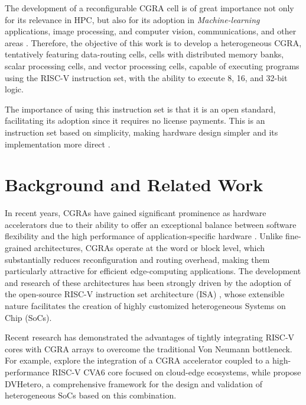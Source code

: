 \documentclass[conference]{IEEEtran}
\begin{document}
The development of a reconfigurable CGRA cell is of great importance not only for its relevance in HPC, but also for its adoption in \textit{Machine-learning} applications, image processing, and computer vision,
communications, and other areas \cite{GuoweiZhu}. Therefore, the objective of this work is to develop a heterogeneous CGRA, tentatively featuring data-routing cells,
cells with distributed memory banks, scalar processing cells, and vector processing cells, capable of executing programs using the RISC-V instruction set, with the ability to execute 8, 16, and 32-bit logic.

The importance of using this instruction set is that it is an open standard, facilitating its adoption since it requires no license payments. This is an instruction set based on simplicity,
making hardware design simpler and its implementation more direct \cite{riscv}.


\section{Background and Related Work}
In recent years, CGRAs have gained significant prominence as hardware accelerators due to their ability to offer an exceptional balance between software flexibility and the high performance of application-specific hardware \cite{LeiboLiu,Podobas}. Unlike fine-grained architectures, CGRAs operate at the word or block level, which substantially reduces reconfiguration and routing overhead, making them particularly attractive for efficient edge-computing applications. The development and research of these architectures has been strongly driven by the adoption of the open-source RISC-V instruction set architecture (ISA) \cite{riscv}, whose extensible nature facilitates the creation of highly customized heterogeneous Systems on Chip (SoCs).

Recent research has demonstrated the advantages of tightly integrating RISC-V cores with CGRA arrays to overcome the traditional Von Neumann bottleneck. For example, \cite{granja} explore the integration of a CGRA accelerator coupled to a high-performance RISC-V CVA6 core focused on cloud-edge ecosystems, while \cite{GuoweiZhu} propose DVHetero, a comprehensive framework for the design and validation of heterogeneous SoCs based on this combination.
\end{document}
